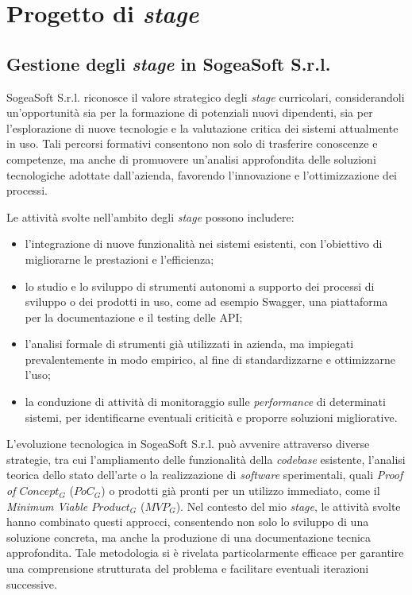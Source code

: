 \chapter{Progetto di \textit{stage}}
    \section{Gestione degli \textit{stage} in SogeaSoft S.r.l.}
    SogeaSoft S.r.l. riconosce il valore strategico degli \textit{stage} curricolari, considerandoli un'opportunità sia per la formazione di potenziali nuovi dipendenti, sia per l'esplorazione di nuove tecnologie e la valutazione critica dei sistemi attualmente in uso. Tali percorsi formativi consentono non solo di trasferire conoscenze e competenze, ma anche di promuovere un'analisi approfondita delle soluzioni tecnologiche adottate dall'azienda, favorendo l'innovazione e l'ottimizzazione dei processi.  

    \vspace{0.2 em}
    Le attività svolte nell'ambito degli \textit{stage} possono includere: 
    \begin{itemize}
        \item l'integrazione di nuove funzionalità nei sistemi esistenti, con l'obiettivo di migliorarne le prestazioni e l'efficienza;
        \item lo studio e lo sviluppo di strumenti autonomi a supporto dei processi di sviluppo o dei prodotti in uso, come ad esempio Swagger, una piattaforma per la documentazione e il testing delle API;  
        \item l'analisi formale di strumenti già utilizzati in azienda, ma impiegati prevalentemente in modo empirico, al fine di standardizzarne e ottimizzarne l’uso;  
        \item la conduzione di attività di monitoraggio sulle \textit{performance} di determinati sistemi, per identificarne eventuali criticità e proporre soluzioni migliorative.  
    \end{itemize}

    \vspace{0.2 em}
    \noindent L'evoluzione tecnologica in SogeaSoft S.r.l. può avvenire attraverso diverse strategie, tra cui l’ampliamento delle funzionalità della \textit{codebase} esistente, l’analisi teorica dello stato dell’arte o la realizzazione di \textit{software} sperimentali, quali \textit{Proof of $Concept_G$} ($PoC_G$) o prodotti già pronti per un utilizzo immediato, come il \textit{Minimum Viable $Product_G$} ($MVP_G$). Nel contesto del mio \textit{stage}, le attività svolte hanno combinato questi approcci, consentendo non solo lo sviluppo di una soluzione concreta, ma anche la produzione di una documentazione tecnica approfondita. Tale metodologia si è rivelata particolarmente efficace per garantire una comprensione strutturata del problema e facilitare eventuali iterazioni successive.  

